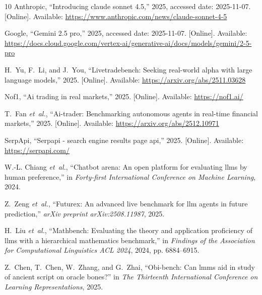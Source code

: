 \documentclass[conference]{IEEEtran}
\begin{document}
\begin{thebibliography}{10}
\BIBentryALTinterwordspacing
Anthropic, ``Introducing claude sonnet 4.5,'' 2025, accessed date: 2025-11-07. [Online]. Available: \url{https://www.anthropic.com/news/claude-sonnet-4-5}
\BIBentrySTDinterwordspacing

\BIBentryALTinterwordspacing
Google, ``Gemini 2.5 pro,'' 2025, accessed date: 2025-11-07. [Online]. Available: \url{https://docs.cloud.google.com/vertex-ai/generative-ai/docs/models/gemini/2-5-pro}
\BIBentrySTDinterwordspacing

\BIBentryALTinterwordspacing
H.~Yu, F.~Li, and J.~You, ``Livetradebench: Seeking real-world alpha with large language models,'' 2025. [Online]. Available: \url{https://arxiv.org/abs/2511.03628}
\BIBentrySTDinterwordspacing

\BIBentryALTinterwordspacing
Nof1, ``Ai trading in real markets,'' 2025. [Online]. Available: \url{https://nof1.ai/}
\BIBentrySTDinterwordspacing

\BIBentryALTinterwordspacing
T.~Fan \emph{et~al.}, ``Ai-trader: Benchmarking autonomous agents in real-time financial markets,'' 2025. [Online]. Available: \url{https://arxiv.org/abs/2512.10971}
\BIBentrySTDinterwordspacing

\BIBentryALTinterwordspacing
SerpApi, ``Serpapi - search engine results page api,'' 2025. [Online]. Available: \url{https://serpapi.com/}
\BIBentrySTDinterwordspacing

W.-L. Chiang \emph{et~al.}, ``Chatbot arena: An open platform for evaluating llms by human preference,'' in \emph{Forty-first International Conference on Machine Learning}, 2024.

Z.~Zeng \emph{et~al.}, ``Futurex: An advanced live benchmark for llm agents in future prediction,'' \emph{arXiv preprint arXiv:2508.11987}, 2025.

H.~Liu \emph{et~al.}, ``Mathbench: Evaluating the theory and application proficiency of llms with a hierarchical mathematics benchmark,'' in \emph{Findings of the Association for Computational Linguistics ACL 2024}, 2024, pp. 6884--6915.

Z.~Chen, T.~Chen, W.~Zhang, and G.~Zhai, ``Obi-bench: Can lmms aid in study of ancient script on oracle bones?'' in \emph{The Thirteenth International Conference on Learning Representations}, 2025.


\end{thebibliography}
\end{document}
